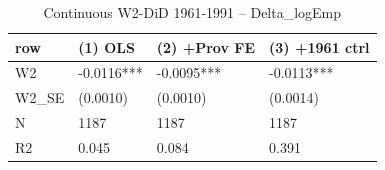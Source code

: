 \begin{table}

\caption{Continuous W2-DiD 1961-1991 -- Delta_logEmp}
\centering
\begin{tabular}[t]{llll}
\toprule
row & (1) OLS & (2) +Prov FE & (3) +1961 ctrl\\
\midrule
W2 & -0.0116*** & -0.0095*** & -0.0113***\\
W2\_SE & (0.0010) & (0.0010) & (0.0014)\\
N & 1187 & 1187 & 1187\\
R2 & 0.045 & 0.084 & 0.391\\
\bottomrule
\end{tabular}
\end{table}

